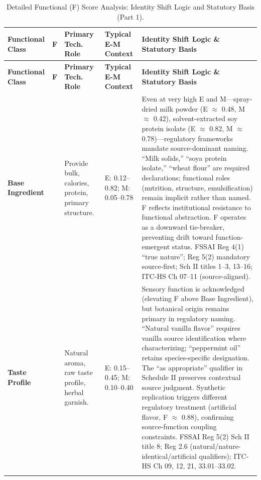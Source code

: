 \documentclass[12pt,a2paper]{article}
\begin{document}
\newpage

\begin{longtable}{
    p{7.0cm}   %
    >{\centering\arraybackslash}p{2.0cm} %
    p{10.0cm}  %
    p{10.0cm}  %
    p{25.0cm}  %
}
\caption{Detailed Functional (F) Score Analysis: Identity Shift Logic and Statutory Basis (Part 1).} \label{tab:f_score_part1} \\
\toprule
\textbf{Functional Class} & \textbf{F} & \textbf{Primary Tech. Role} & \textbf{Typical E-M Context} & \textbf{Identity Shift Logic \& Statutory Basis}\\
\midrule
\endfirsthead
\toprule
\textbf{Functional Class} & \textbf{F} & \textbf{Primary Tech. Role} & \textbf{Typical E-M Context} & \textbf{Identity Shift Logic \& Statutory Basis}\\
\midrule
\endhead
\bottomrule
\endfoot

\textbf{Base Ingredient} & 0.12 & Provide bulk, calories, protein, primary structure. & E: 0.12–0.82; \newline M: 0.05–0.78 & Even at very high E and M—spray-dried milk powder (E $\approx$ 0.48, M $\approx$ 0.42), solvent-extracted soy protein isolate (E $\approx$ 0.82, M $\approx$ 0.78)—regulatory frameworks mandate source-dominant naming. ``Milk solids,'' ``soya protein isolate,'' ``wheat flour'' are required declarations; functional roles (nutrition, structure, emulsification) remain implicit rather than named. F reflects institutional resistance to functional abstraction. F operates as a downward tie-breaker, preventing drift toward function-emergent status. FSSAI Reg 4(1) ``true nature''; Reg 5(2) mandatory source-first; Sch II titles 1–3, 13–16; ITC-HS Ch 07–11 (source-aligned). \cite{legitquest_F2,DGCI_CH11_F2} \\ \addlinespace[2.5ex]

\textbf{Taste Profile} & 0.18 & Natural aroma, raw taste profile, herbal garnish. & E: 0.15–0.45; \newline M: 0.10–0.40 & Sensory function is acknowledged (elevating F above Base Ingredient), but botanical origin remains primary in regulatory naming. ``Natural vanilla flavor'' requires vanilla source identification where characterizing; ``peppermint oil'' retains species-specific designation. The ``as appropriate'' qualifier in Schedule II preserves contextual source judgment. Synthetic replication triggers different regulatory treatment (artificial flavor, F $\approx$ 0.88), confirming source-function coupling constraints. FSSAI Reg 5(2) Sch II title 8; Reg 2.6 (natural/nature-identical/artificial qualifiers); ITC-HS Ch 09, 12, 21, 33.01–33.02. \cite{legitquest_F2} \\ \addlinespace[2.5ex]


\end{longtable}
\end{document}
